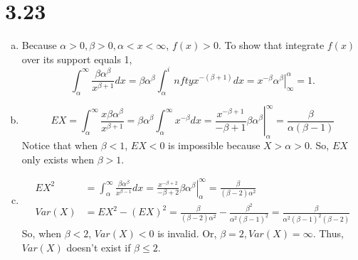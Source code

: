 \documentclass[letterpaper]{article}
\begin{document}
    \section*{3.23}
    \begin{enumerate}[(a)]
        \item Because $\alpha > 0, \beta > 0, \alpha < x < \infty$, $f(x) > 0$.
        To show that integrate $f(x)$ over its support equals 1, 
        \[
        \int_\alpha^\infty \frac{\beta \alpha^\beta}{x^{\beta+1}} dx = \beta \alpha^\beta \int_\alpha^infty x^{-(\beta+1)} dx = \left. x^{-\beta} \alpha^\beta \right|^\alpha_\infty = 1.
        \]
        \item
        \[
        EX = \int_\alpha^\infty \frac{x \beta \alpha^\beta}{x^{\beta+1}} = 
        \beta \alpha^\beta \int_\alpha^\infty x^{-\beta} dx = \left. \frac{x^{-\beta+1}}{-\beta+1} \beta \alpha^\beta \right|^\infty_\alpha = \frac{\beta}{\alpha(\beta-1)}
        \]
        Notice that when $\beta < 1$, $EX < 0$ is impossible because $X > \alpha > 0$. So, $EX$ only exists when $\beta > 1$.
        \item 
        \begin{align*}
        EX^2 & = \int_\alpha^\infty \frac{\beta \alpha^\beta}{x^{\beta-1}} dx =
        \left. \frac{x^{-\beta+2}}{-\beta+2} \beta \alpha^\beta \right|_\alpha^\infty = \frac{\beta}{(\beta-2)\alpha^2} \\
        Var(X) &= EX^2 - (EX)^2 = \frac{\beta}{(\beta-2)\alpha^2} - \frac{\beta^2}{\alpha^2 (\beta-1)^2} = \frac{\beta}{\alpha^2 (\beta-1)^2 (\beta-2)}
        \end{align*}
        So, when $\beta < 2$, $Var(X) < 0$ is invalid. Or, $\beta = 2, Var(X) = \infty$. Thus, $Var(X)$ doesn't exist if $\beta \le 2$.
    \end{enumerate}
\end{document}
